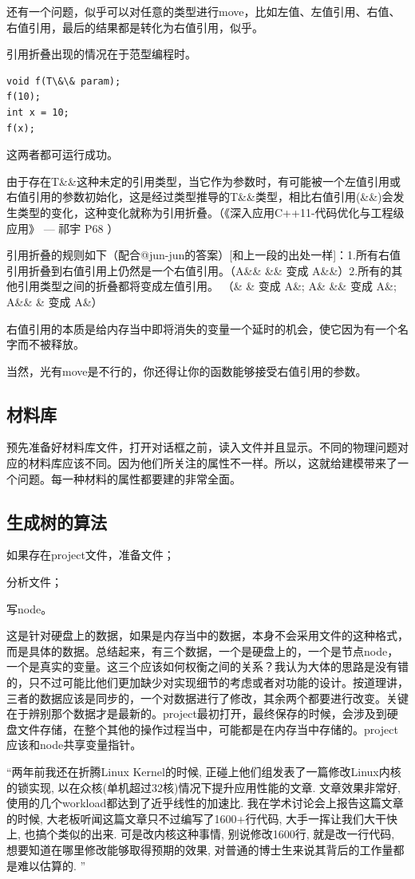 还有一个问题，似乎可以对任意的类型进行move，比如左值、左值引用、右值、右值引用，最后的结果都是转化为右值引用，似乎。

引用折叠出现的情况在于范型编程时。

\begin{lstlisting}
void f(T\&\& param);
f(10);
int x = 10;
f(x);
\end{lstlisting}
这两者都可运行成功。

由于存在T\&\&这种未定的引用类型，当它作为参数时，有可能被一个左值引用或右值引用的参数初始化，这是经过类型推导的T\&\&类型，相比右值引用(\&\&)会发生类型的变化，这种变化就称为引用折叠。（《深入应用C++11-代码优化与工程级应用》 --- 祁宇 P68 ）

引用折叠的规则如下（配合@jun-jun的答案）[和上一段的出处一样]：1.所有右值引用折叠到右值引用上仍然是一个右值引用。（A\&\& \&\& 变成 A\&\&）2.所有的其他引用类型之间的折叠都将变成左值引用。 （\& \& 变成 A\&; A\& \&\& 变成 A\&; A\&\& \& 变成 A\&）

右值引用的本质是给内存当中即将消失的变量一个延时的机会，使它因为有一个名字而不被释放。

当然，光有move是不行的，你还得让你的函数能够接受右值引用的参数。
\subsection{材料库}
预先准备好材料库文件，打开对话框之前，读入文件并且显示。不同的物理问题对应的材料库应该不同。因为他们所关注的属性不一样。所以，这就给建模带来了一个问题。每一种材料的属性都要建的非常全面。
\subsection{生成树的算法}
如果存在project文件，准备文件；

分析文件；

写node。

这是针对硬盘上的数据，如果是内存当中的数据，本身不会采用文件的这种格式，而是具体的数据。总结起来，有三个数据，一个是硬盘上的，一个是节点node，一个是真实的变量。这三个应该如何权衡之间的关系？我认为大体的思路是没有错的，只不过可能比他们更加缺少对实现细节的考虑或者对功能的设计。按道理讲，三者的数据应该是同步的，一个对数据进行了修改，其余两个都要进行改变。关键在于辨别那个数据才是最新的。project最初打开，最终保存的时候，会涉及到硬盘文件存储，在整个其他的操作过程当中，可能都是在内存当中存储的。project应该和node共享变量指针。

“两年前我还在折腾Linux Kernel的时候, 正碰上他们组发表了一篇修改Linux内核的锁实现, 以在众核(单机超过32核)情况下提升应用性能的文章. 文章效果非常好, 使用的几个workload都达到了近乎线性的加速比. 我在学术讨论会上报告这篇文章的时候, 大老板听闻这篇文章只不过编写了1600+行代码, 大手一挥让我们大干快上, 也搞个类似的出来. 可是改内核这种事情, 别说修改1600行, 就是改一行代码, 想要知道在哪里修改能够取得预期的效果, 对普通的博士生来说其背后的工作量都是难以估算的. ”
